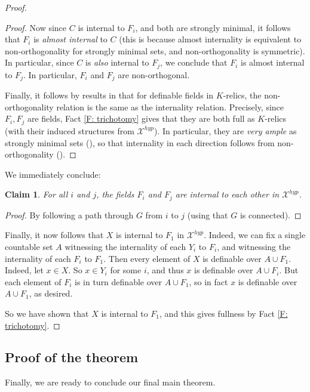 \documentclass{amsart}
\newtheorem{claim}[theorem]{Claim}
\theoremstyle{definition}
\begin{document}
\begin{proof}
\begin{proof}
    Now since $C$ is internal to $F_i$, and both are strongly minimal, it follows that $F_i$ is \textit{almost internal} to $C$ (this is because almost internality is equivalent to non-orthogonality for strongly minimal sets, and non-orthogonality is symmetric). In particular, since $C$ is \textit{also} internal to $F_j$, we conclude that $F_i$ is almost internal to $F_j$. In particular, $F_i$ and $F_j$ are non-orthogonal.

    Finally, it follows by results in \cite{CasHasVA} that for definable fields in $K$-relics, the non-orthogonality relation is the same as the internality relation. Precisely, since $F_i,F_j$ are fields, Fact \ref{F: trichotomy} gives that they are both full as $K$-relics (with their induced structures from $\mathcal X^{hyp}$). In particular, they are \textit{very ample} as strongly minimal sets (\cite[Theorem 4.14]{CasHasVA}), so that internality in each direction follows from non-orthogonality (\cite[Proposition 4.1]{CasHasVA}). 
    \end{proof}
    We immediately conclude:
    \begin{claim}
        For all $i$ and $j$, the fields $F_i$ and $F_j$ are internal to each other in $\mathcal X^{hyp}$.
    \end{claim}
    \begin{proof} By following a path through $G$ from $i$ to $j$ (using that $G$ is connected).
    \end{proof}

    Finally, it now follows that $X$ is internal to $F_1$ in $\mathcal X^{hyp}$. Indeed, we can fix a single countable set $A$ witnessing the internality of each $Y_i$ to $F_i$, and witnessing the internality of each $F_i$ to $F_1$. Then every element of $X$ is definable over $A\cup F_1$. Indeed, let $x\in X$. So $x\in Y_i$ for some $i$, and thus $x$ is definable over $A\cup F_i$. But each element of $F_i$ is in turn definable over $A\cup F_1$, so in fact $x$ is definable over $A\cup F_1$, as desired.

    So we have shown that $X$ is internal to $F_1$, and this gives fullness by Fact \ref{F: trichotomy}.
\end{proof}

\subsection{Proof of the theorem}

Finally, we are ready to conclude our final main theorem.
\end{document}
